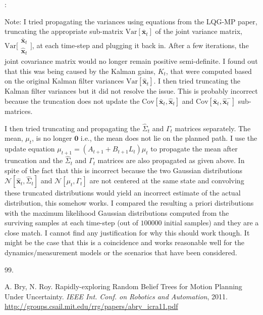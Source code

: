 \documentclass[letterpaper]{article}
\renewenvironment{thebibliography}[1]{%
  \begin{oldthebibliography}{#1}%
    \setlength{\parskip}{0ex}%
    \setlength{\itemsep}{0ex}%
}%
{%
  \end{oldthebibliography}%
}
\begin{document}
\vspace{10pt}
:

{\color{red} Note:} I tried propagating the variances using equations from the LQG-MP paper, truncating the appropriate sub-matrix $\mathrm{Var}[\bar{\mathbf{x}}_t]$ of the joint variance matrix, $\mathrm{Var}\bigl[\begin{smallmatrix} \bar{\mathbf{x}}_t \\ \hat{\mathbf{x}}_t \end{smallmatrix}\bigr]$, at each time-step and plugging it back in. After a few iterations, the joint covariance matrix would no longer remain positive semi-definite. I found out that this was being caused by the Kalman gains, $K_t$, that were computed based on the original Kalman filter variances $\mathrm{Var}[\hat{\mathbf{x}}_t]$. I then tried truncating the Kalman filter variances but it did not resolve the issue. This is probably incorrect because the truncation does not update the $\mathrm{Cov}[\bar{\mathbf{x}}_t, \hat{\mathbf{x}}_t]$ and $\mathrm{Cov}[\bar{\mathbf{x}}_t, \hat{\mathbf{x}}^{-}_t]$ sub-matrices.

I then tried truncating and propagating the $\hat{\Sigma}_t$ and $\Gamma_t$ matrices separately. The mean, $\mu_t$, is no longer $\mathbf{0}$ i.e., the mean does not lie on the planned path. I use the update equation $\mu_{t+1} = (A_{t+1} + B_{t+1} L_{t})\mu_{t}$ to propagate the mean after truncation and the $\hat{\Sigma}_t$ and $\Gamma_t$ matrices are also propagated as given above. In spite of the fact that this is incorrect because the two Gaussian distributions $\mathcal{N}[\hat{\mathbf{x}}_t, \hat{\Sigma}_t]$ and $\mathcal{N}[\mu_t, \Gamma_t]$ are not centered at the same state and convolving these truncated distributions would yield an incorrect estimate of the actual distribution, this somehow works. I compared the resulting a priori distributions with the maximum likelihood Gaussian distributions computed from the surviving samples at each time-step (out of $100000$ initial samples) and they are a close match. I cannot find any justification for why this should work though. It might be the case that this is a coincidence and works reasonable well for the dynamics/measurement models or the scenarios that have been considered.

\begin{thebibliography}{99.}
 A. Bry, N. Roy. Rapidly-exploring Random Belief Trees for Motion Planning Under Uncertainty. \emph{IEEE Int. Conf. on Robotics and Automation}, 2011. \url{http://groups.csail.mit.edu/rrg/papers/abry_icra11.pdf}

\end{thebibliography}
\end{document}

